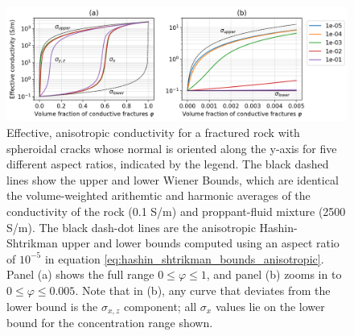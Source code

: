 \begin{figure}
    \begin{center}
    \includegraphics[width=\columnwidth]{figures/phys_prop_model/aligned_fractures.png}
    \end{center}
\caption{
    Effective, anisotropic conductivity for a fractured rock with spheroidal
    cracks whose normal is oriented along the y-axis for five different aspect ratios, indicated by the legend.
    The black dashed lines show the upper and lower
    Wiener Bounds, which are identical the volume-weighted arithemtic and harmonic averages of the
    conductivity of the rock (0.1 S/m) and proppant-fluid mixture (2500 S/m). The black dash-dot lines
    are the anisotropic Hashin-Shtrikman upper and lower bounds computed using an aspect ratio of $10^{-5}$ in
    equation \ref{eq:hashin_shtrikman_bounds_anisotropic}.
    Panel (a) shows the
    full range $0 \leq \varphi \leq 1$, and panel (b) zooms in to $0 \leq \varphi \leq 0.005$.
    Note that in (b), any curve that deviates from the lower bound is the $\sigma_{x, z}$ component;
    all $\sigma_x$ values lie on the lower bound for the concentration range shown.
}
\label{fig:aligned_fractures}
\end{figure}
